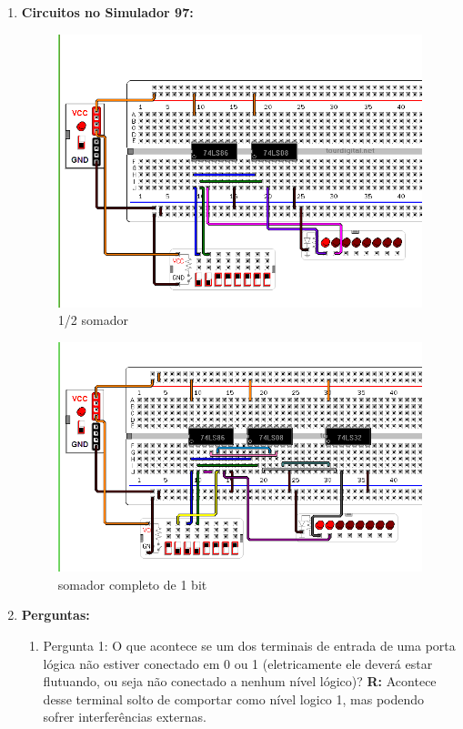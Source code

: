 \documentclass[a4paper,11pt]{article}
\begin{document}
\begin{enumerate}
\begin{figure}[ht]
        \end{figure}
        \newpage
    \item \textbf{Circuitos no Simulador 97:}
        \begin{figure}[ht]
            \vspace{-0.2cm}
            \caption{1/2 somador}
            \centering
            \includegraphics[width=11cm]{simulador97-meioSomador}
        \end{figure}
        \begin{figure}[ht]
            \vspace{-1cm}
            \caption{somador completo de 1 bit}
            \centering
            \includegraphics[width=11cm]{simulador97-somadorCompleto}
        \end{figure}
        \newpage
    \item \textbf{Perguntas:}
        \begin{enumerate}
            \item{Pergunta 1: O que acontece se um dos terminais de entrada de uma porta lógica não
                    estiver conectado em 0 ou 1 (eletricamente ele deverá estar flutuando, ou seja não
                    conectado a nenhum nível lógico)?}
                \newline
                \textbf{R:} Acontece desse terminal solto de comportar como nível logico 1, mas podendo
                sofrer interferências externas.
                \bigskip


\end{enumerate}
\end{enumerate}
\end{document}
